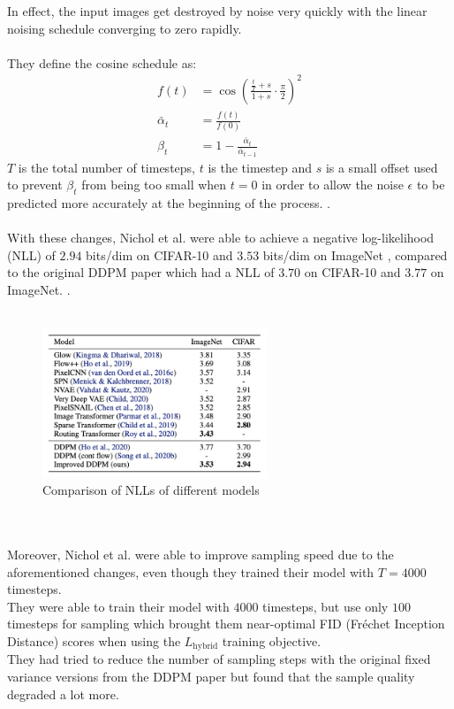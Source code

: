 \documentclass[twoside]{article}
\numberwithin{equation}{section}
\numberwithin{figure}{section}
\begin{document}
In effect, the input images get destroyed by noise very quickly with the linear noising schedule converging to zero rapidly. \cite{nichol2021improved}
\\\\
They define the cosine schedule as:
\begin{align}
  f(t) &= \cos \left( \frac{\frac{t}{T} + s}{1 + s} \cdot \frac{\pi}{2} \right)^2 \\
  \bar{\alpha}_t &= \frac{f(t)}{f(0)} \\
  \beta_t &= 1 - \frac{\bar{\alpha}_t}{\bar{\alpha}_{t-1}}
\end{align}
$T$ is the total number of timesteps, $t$ is the timestep and $s$ is a small offset used to prevent $\beta_t$ from being too small when $t = 0$ in order to allow the noise $\epsilon$ to be predicted more accurately at the beginning of the process. \cite{nichol2021improved}.
\\\\
With these changes, Nichol et al. \cite{nichol2021improved} were able to achieve a negative log-likelihood (NLL) of $2.94$ bits/dim on CIFAR-10 \cite{cifar10} and $3.53$ bits/dim on ImageNet \cite{oord2016conditional}, compared to the original DDPM paper \cite{ho2020denoising} which had a NLL of $3.70$ on CIFAR-10 and $3.77$ on ImageNet. \cite{nichol2021improved}.
\\\\
\begin{figure}[h]
  \begin{center}
    \includegraphics[width= 0.6\textwidth]{images/comparison.png}
    \caption{Comparison of NLLs of different models \cite{nichol2021improved}}
  \end{center}
\end{figure}
\\\\
Moreover, Nichol et al. \cite{nichol2021improved} were able to improve sampling speed due to the aforementioned changes, even though they trained their model with $T = 4000$ timesteps. \\
They were able to train their model with $4000$ timesteps, but use only $100$ timesteps for sampling which brought them near-optimal FID (Fréchet Inception Distance) scores when using the $L_{\text{hybrid}}$ training objective. \cite{nichol2021improved} \\
They had tried to reduce the number of sampling steps with the original fixed variance versions from the DDPM paper \cite{ho2020denoising} but found that the sample quality degraded a lot more. \cite{nichol2021improved}
\end{document}
